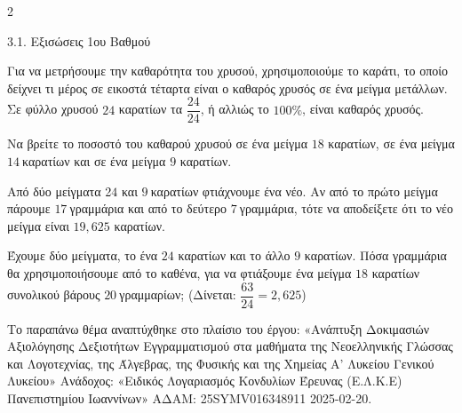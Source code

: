 \begin{ylh}{2}
    \item 3.1. Εξισώσεις 1ου Βαθμού
\end{ylh}
Για να μετρήσουμε την καθαρότητα του χρυσού, χρησιμοποιούμε το καράτι, το οποίο δείχνει τι μέρος σε εικοστά τέταρτα είναι ο καθαρός χρυσός σε ένα μείγμα μετάλλων. Σε φύλλο χρυσού $24$ καρατίων τα $\dfrac{24}{24}$, ή αλλιώς το $100\%$, είναι καθαρός χρυσός.

\begin{alist}
\item Να βρείτε το ποσοστό του καθαρού χρυσού σε ένα μείγμα $18$ καρατίων, σε ένα μείγμα $14\ $καρατίων και σε ένα μείγμα $9$ καρατίων.
\item Από δύο μείγματα 2$4$ και $9\ $καρατίων φτιάχνουμε ένα νέο. Αν από το πρώτο μείγμα πάρουμε $17\ $γραμμάρια και από το δεύτερο $7\ $γραμμάρια, τότε να αποδείξετε ότι το νέο μείγμα είναι $19,625$ καρατίων.
\item Έχουμε δύο μείγματα, το ένα $24$ καρατίων και το άλλο $9$ καρατίων. Πόσα γραμμάρια θα χρησιμοποιήσουμε από το καθένα, για να φτιάξουμε ένα μείγμα $18$ καρατίων συνολικού βάρους $20\ $γραμμαρίων;
(Δίνεται: $\dfrac{63}{24} = 2,625$)

{\footnotesize Το παραπάνω θέμα αναπτύχθηκε στο πλαίσιο του έργου: «Ανάπτυξη Δοκιμασιών Αξιολόγησης Δεξιοτήτων Εγγραμματισμού στα μαθήματα της Νεοελληνικής Γλώσσας και Λογοτεχνίας, της Άλγεβρας, της Φυσικής και της Χημείας Α' Λυκείου Γενικού Λυκείου» Ανάδοχος: «Ειδικός Λογαριασμός Κονδυλίων Έρευνας (Ε.Λ.Κ.Ε) Πανεπιστημίου Ιωαννίνων» ΑΔΑΜ: 25SYMV016348911 2025-02-20.}
\end{alist}

